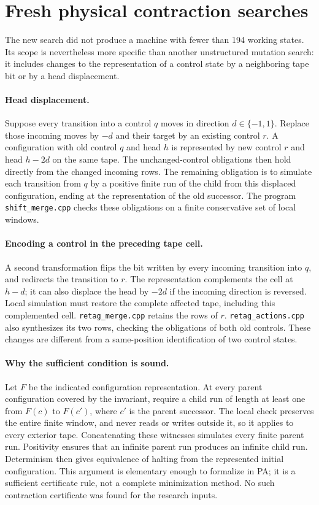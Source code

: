 \section{Fresh physical contraction searches}
\label{sec:fresh-physical}
The new search did not produce a machine with fewer than 194 working
states. Its scope is nevertheless more specific than another unstructured
mutation search: it includes changes to the representation of a control
state by a neighboring tape bit or by a head displacement.

\paragraph{Head displacement.}
Suppose every transition into a control $q$ moves in direction
$d\in\{-1,1\}$. Replace those incoming moves by $-d$ and their target by
an existing control $r$. A configuration with old control $q$ and head $h$
is represented by new control $r$ and head $h-2d$ on the same tape.
The unchanged-control obligations then hold directly from the changed
incoming rows. The remaining obligation is to simulate each transition
from $q$ by a positive finite run of the child from this displaced
configuration, ending at the representation of the old successor.
The program \texttt{shift\_merge.cpp} checks these obligations on a finite
conservative set of local windows.

\paragraph{Encoding a control in the preceding tape cell.}
A second transformation flips the bit written by every incoming
transition into $q$, and redirects the transition to $r$. The
representation complements the cell at $h-d$; it can also displace the
head by $-2d$ if the incoming direction is reversed. Local simulation must
restore the complete affected tape, including this complemented cell.
\texttt{retag\_merge.cpp} retains the rows of $r$.
\texttt{retag\_actions.cpp} also synthesizes its two rows, checking the
obligations of both old controls. These changes are different from a
same-position identification of two control states.

\paragraph{Why the sufficient condition is sound.}
Let $F$ be the indicated configuration representation. At every parent
configuration covered by the invariant, require a child run of length at
least one from $F(c)$ to $F(c')$, where $c'$ is the parent successor.
The local check preserves the entire finite window, and never reads or
writes outside it, so it applies to every exterior tape. Concatenating
these witnesses simulates every finite parent run. Positivity ensures
that an infinite parent run produces an infinite child run. Determinism
then gives equivalence of halting from the represented initial
configuration. This argument is elementary enough to formalize in PA;
it is a sufficient certificate rule, not a complete minimization method.
No such contraction certificate was found for the research inputs.

